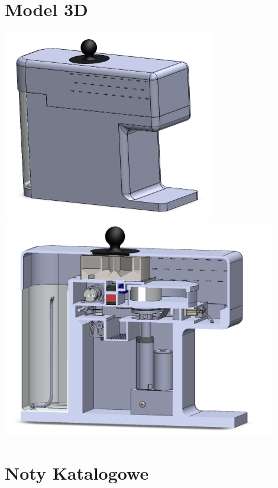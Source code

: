 \documentclass[a4paper,12pt, openany]{article}
\begin{document}
\section{Model 3D}
\begin{center}
 \includegraphics[width=0.7\textwidth]{model2.png}
 \includegraphics[width=0.9\textwidth]{model.png}
\end{center}




\section{Noty Katalogowe}
\end{document}
